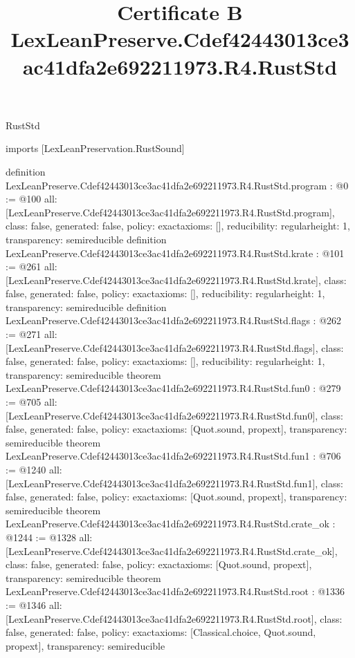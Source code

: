 \begin{lexlean}{RustStd}
\title{Certificate B LexLeanPreserve.Cdef42443013ce3ac41dfa2e692211973.R4.RustStd}
\begin{coremodule}
imports [LexLeanPreservation.RustSound]

definition LexLeanPreserve.Cdef42443013ce3ac41dfa2e692211973.R4.RustStd.program : @0 := @100 {
  all: [LexLeanPreserve.Cdef42443013ce3ac41dfa2e692211973.R4.RustStd.program],
  class: false,
  generated: false,
  policy: exact{axioms: []},
  reducibility: regular{height: 1},
  transparency: semireducible
}
definition LexLeanPreserve.Cdef42443013ce3ac41dfa2e692211973.R4.RustStd.krate : @101 := @261 {
  all: [LexLeanPreserve.Cdef42443013ce3ac41dfa2e692211973.R4.RustStd.krate],
  class: false,
  generated: false,
  policy: exact{axioms: []},
  reducibility: regular{height: 1},
  transparency: semireducible
}
definition LexLeanPreserve.Cdef42443013ce3ac41dfa2e692211973.R4.RustStd.flags : @262 := @271 {
  all: [LexLeanPreserve.Cdef42443013ce3ac41dfa2e692211973.R4.RustStd.flags],
  class: false,
  generated: false,
  policy: exact{axioms: []},
  reducibility: regular{height: 1},
  transparency: semireducible
}
theorem LexLeanPreserve.Cdef42443013ce3ac41dfa2e692211973.R4.RustStd.fun0 : @279 := @705 {
  all: [LexLeanPreserve.Cdef42443013ce3ac41dfa2e692211973.R4.RustStd.fun0],
  class: false,
  generated: false,
  policy: exact{axioms: [Quot.sound, propext]},
  transparency: semireducible
}
theorem LexLeanPreserve.Cdef42443013ce3ac41dfa2e692211973.R4.RustStd.fun1 : @706 := @1240 {
  all: [LexLeanPreserve.Cdef42443013ce3ac41dfa2e692211973.R4.RustStd.fun1],
  class: false,
  generated: false,
  policy: exact{axioms: [Quot.sound, propext]},
  transparency: semireducible
}
theorem LexLeanPreserve.Cdef42443013ce3ac41dfa2e692211973.R4.RustStd.crate_ok : @1244 := @1328 {
  all: [LexLeanPreserve.Cdef42443013ce3ac41dfa2e692211973.R4.RustStd.crate_ok],
  class: false,
  generated: false,
  policy: exact{axioms: [Quot.sound, propext]},
  transparency: semireducible
}
theorem LexLeanPreserve.Cdef42443013ce3ac41dfa2e692211973.R4.RustStd.root : @1336 := @1346 {
  all: [LexLeanPreserve.Cdef42443013ce3ac41dfa2e692211973.R4.RustStd.root],
  class: false,
  generated: false,
  policy: exact{axioms: [Classical.choice, Quot.sound, propext]},
  transparency: semireducible
}


\end{coremodule}
\end{lexlean}
